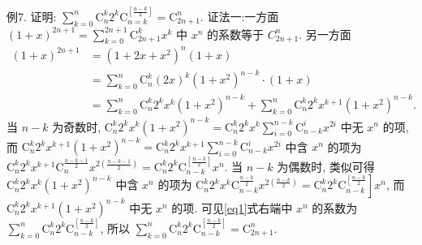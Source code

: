 例7. 证明: $\sum_{k=0}^n \mathrm{C}_n^k 2^k \mathrm{C}_{n=k}^{\left[\frac{n-k}{2}\right]}=\mathrm{C}_{2 n+1}^n$. 
证法一:一方面 $(1+x)^{2 n+1}=\sum_{k=0}^{2 n+1} \mathrm{C}_{2 n+1}^k x^k$ 中 $x^n$ 的系数等于 $C_{2 n+1}^n$. 另一方面
$$
\begin{aligned}
(1+x)^{2 n+1} & =\left(1+2 x+x^2\right)^n(1+x) \\
& =\sum_{k=0}^n \mathrm{C}_n^k(2 x)^k\left(1+x^2\right)^{n-k} \cdot(1+x) \\
& =\sum_{k=0}^n \mathrm{C}_n^k 2^k x^k\left(1+x^2\right)^{n-k}+\sum_{k=0}^n \mathrm{C}_n^k 2^k x^{k+1}\left(1+x^2\right)^{n-k} . \label{eq1}
\end{aligned}
$$
当 $n-k$ 为奇数时, $\mathrm{C}_n^k 2^k x^k\left(1+x^2\right)^{n-k}=\mathrm{C}_n^k 2^k x^k \sum_{i=0}^{n-k} \mathrm{C}_{n-k}^i x^{2 i}$ 中无 $x^n$ 的项, 而 $\mathrm{C}_n^k 2^k x^{k+1}\left(1+x^2\right)^{n-k}=\mathrm{C}_n^k 2^k x^{k+1} \sum_{i=0}^{n-k} \mathrm{C}_{n-k}^i x^{2 i}$ 中含 $x^n$ 的项为 $\mathrm{C}_n^k 2^k x^{k+1} \mathrm{C}_n^{\frac{n-k-1}{2}} x^{2\left(\frac{n-k-1}{2}\right)} =\mathrm{C}_n^k 2^k \mathrm{C}_{n-k}^{\left[\frac{n-k}{2}\right]} x^n$.
当 $n-k$ 为偶数时, 类似可得 $\mathrm{C}_n^k 2^k x^k\left(1+x^2\right)^{n-k}$ 中含 $x^n$ 的项为 $\left.\mathrm{C}_n^k 2^k x^k \mathrm{C}_{n-k}^{\frac{n-k}{2}} x^{2\left(\frac{n-k}{2}\right)}=\mathrm{C}_n^k 2^k \mathrm{C}_{n-k}^{\left[\frac{n-k}{2}\right.}\right] x^n$, 而 $\mathrm{C}_n^k 2^k x^{k+1}\left(1+x^2\right)^{n-k}$ 中无 $x^n$ 的项.
可见\ref{eq1}式右端中 $x^n$ 的系数为 $\sum_{k=0}^n \mathrm{C}_n^k 2^k \mathrm{C}_{n-k}^{\left[\frac{n-k}{2}\right]}$, 所以 $\sum_{k=0}^n \mathrm{C}_n^k 2^k \mathrm{C}_{n-k}^{\left[\frac{n-k}{2}\right]}=\mathrm{C}_{2 n+1}^n$.



